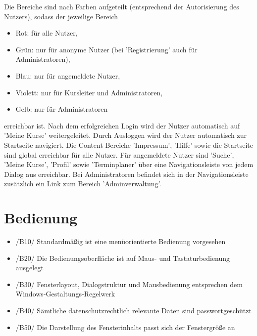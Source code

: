 \documentclass[a4paper]{scrreprt}
\begin{document}
	    Die Bereiche sind  nach Farben aufgeteilt (entsprechend der Autorisierung des Nutzers), sodass der jeweilige Bereich
	    \begin{itemize}
		    \item Rot: für alle Nutzer,
		    \item Grün: nur für anonyme Nutzer (bei 'Registrierung' auch für Administratoren),
		    \item Blau: nur für angemeldete Nutzer,
		    \item Violett: nur für Kursleiter und Administratoren,
		    \item Gelb: nur für Administratoren
	    \end{itemize}
	    erreichbar ist.
	    \newline
	    Nach dem erfolgreichen Login wird der Nutzer automatisch auf 'Meine Kurse' weitergeleitet.
	    \newline
	    Durch Ausloggen wird der Nutzer automatisch zur Startseite navigiert.
	    \newline
	    Die Content-Bereiche 'Impressum', 'Hilfe' sowie die Startseite sind global erreichbar für alle Nutzer.
	    \newline
	    Für angemeldete Nutzer sind 'Suche', 'Meine Kurse', 'Profil' sowie 'Terminplaner' über eine Navigationsleiste von jedem Dialog aus erreichbar.
	    \newline
	    Bei Administratoren befindet sich in der Navigationsleiste zusätzlich ein Link zum Bereich 'Adminverwaltung'.
        
    \section{Bedienung}       
	    \begin{itemize}
			\item /B10/ Standardmäßig ist eine menüorientierte Bedienung vorgesehen
			\item /B20/ Die Bedienungsoberfläche ist auf Maus- und Tastaturbedienung ausgelegt
			\item /B30/ Fensterlayout, Dialogstruktur und Mausbedienung entsprechen dem Windows-Gestaltungs-Regelwerk
			\item /B40/ Sämtliche datenschutzrechtlich relevante Daten sind passwortgeschützt
			\item /B50/ Die Darstellung des Fensterinhalts passt sich der Fenstergröße an
		\end{itemize}
            
            
         
\end{document}
